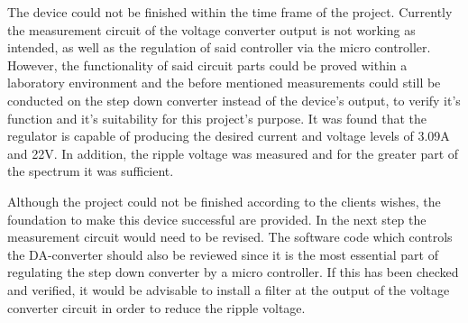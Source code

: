 \documentclass[a4paper]{fhnwreport}
\begin{document}
The device could not be finished within the time frame of the project. Currently the measurement circuit of the voltage converter output is not working as intended, as well as the regulation of said controller via the micro controller. However, the functionality of said circuit parts could be proved within a laboratory environment and the before mentioned measurements could still be conducted on the step down converter instead of the device's output, to verify it's function and it's suitability for this project's purpose. It was found that the regulator is capable of producing the desired current and voltage levels of 3.09A and 22V. In addition, the ripple voltage was measured and for the greater part of the spectrum it was sufficient.

Although the project could not be finished according to the clients wishes, the foundation to make this device successful are provided. In the next step the measurement circuit would need to be revised. The software code which controls the DA-converter should also be reviewed since it is the most essential part of regulating the step down converter by a micro controller. If this has been checked and verified, it would be advisable to install a filter at the output of the voltage converter circuit in order to reduce the ripple voltage.

 
\end{document}

